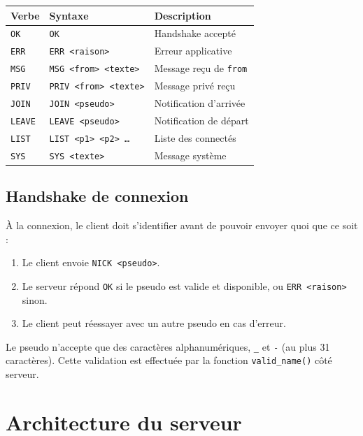 \documentclass[12pt,a4paper]{article}
\begin{document}
\begin{center}
\begin{tabular}{@{}lll@{}}
\toprule
Verbe & Syntaxe & Description \\
\midrule
\texttt{OK}    & \texttt{OK}                     & Handshake accepté \\
\texttt{ERR}   & \texttt{ERR <raison>}            & Erreur applicative \\
\texttt{MSG}   & \texttt{MSG <from> <texte>}      & Message reçu de \texttt{from} \\
\texttt{PRIV}  & \texttt{PRIV <from> <texte>}     & Message privé reçu \\
\texttt{JOIN}  & \texttt{JOIN <pseudo>}            & Notification d'arrivée \\
\texttt{LEAVE} & \texttt{LEAVE <pseudo>}           & Notification de départ \\
\texttt{LIST}  & \texttt{LIST <p1> <p2> \ldots}   & Liste des connectés \\
\texttt{SYS}   & \texttt{SYS <texte>}             & Message système \\
\bottomrule
\end{tabular}
\end{center}

\subsection{Handshake de connexion}

À la connexion, le client doit s'identifier avant de pouvoir envoyer quoi que
ce soit :

\begin{enumerate}
    \item Le client envoie \texttt{NICK <pseudo>}.
    \item Le serveur répond \texttt{OK} si le pseudo est valide et disponible,
          ou \texttt{ERR <raison>} sinon.
    \item Le client peut réessayer avec un autre pseudo en cas d'erreur.
\end{enumerate}

Le pseudo n'accepte que des caractères alphanumériques, \texttt{\_} et
\texttt{-} (au plus 31 caractères). Cette validation est effectuée par la
fonction \texttt{valid\_name()} côté serveur.

\section{Architecture du serveur}
\end{document}
